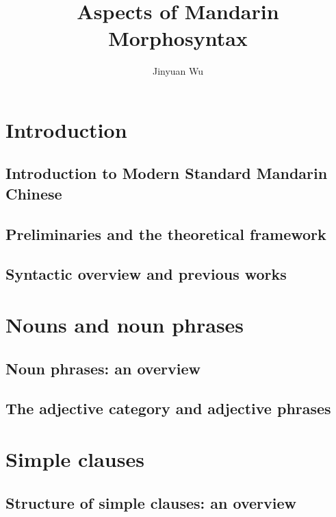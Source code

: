 \documentclass[UTF8, a4paper, oneside, scheme=plain]{ctexbook}
\title{Aspects of Mandarin Morphosyntax}
\author{Jinyuan Wu}
\numberwithin{equation}{chapter}
\numberwithin{equation}{chapter}
\begin{document}
\maketitle

\automath

\part{Introduction}

\chapter{Introduction to Modern Standard Mandarin Chinese}



\chapter{Preliminaries and the theoretical framework}



\chapter{Syntactic overview and previous works}



\part{Nouns and noun phrases}

\chapter{Noun phrases: an overview}



\chapter{The adjective category and adjective phrases}



\part{Simple clauses}

\chapter{Structure of simple clauses: an overview}\label{chap:basic-clause-structure}
\end{document}
